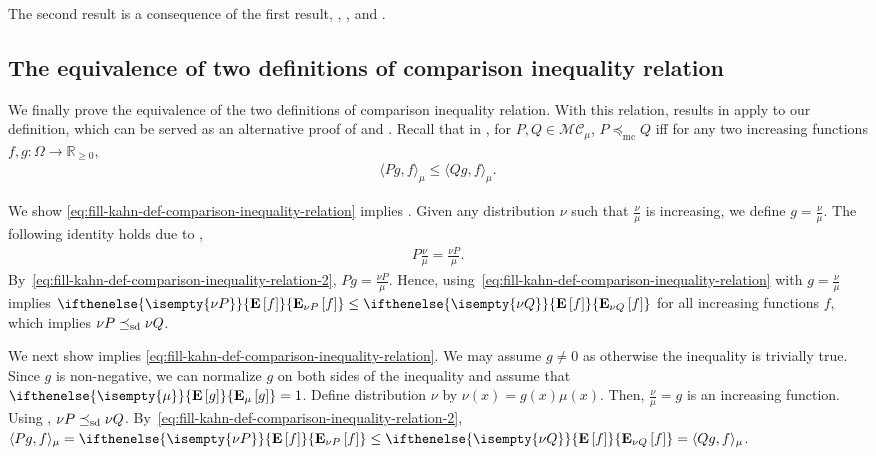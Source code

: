 \documentclass[11pt,a4paper]{article}
\newcommand{\sd}{\preceq_{\textnormal{sd}}}
\theoremstyle{definition}
\def\+#1{\mathcal{#1}} %
\newcommand{\E}[2][]{ \ifthenelse{\isempty{#1}}
  {\mathbf{\mathbf{E}}\left[#2\right]}
  {\mathbf{\mathbf{E}}_{#1}\left[#2\right]} }
\begin{document}
The second result is a consequence of the first result, , , and .


\subsection{The equivalence of two definitions of comparison inequality relation}
We finally prove the equivalence of the two definitions of comparison inequality relation. 
With this relation, results in \cite{FillK13} apply to our definition, which can be served as an alternative proof of  and .
Recall that in \cite{FillK13}, for $P,Q \in \+{MC}_\mu$, $P \preceq_{\text{mc}} Q$ iff for any two increasing functions $f,g:\Omega \to \mathbb{R}_{\geq 0}$, 
\begin{align}\label{eq:fill-kahn-def-comparison-inequality-relation}  
\langle Pg, f \rangle_\mu \leq \langle Qg, f \rangle_\mu.
\end{align}


We show \eqref{eq:fill-kahn-def-comparison-inequality-relation} implies . Given any distribution $\nu$ such that $\frac{\nu}{\mu}$ is increasing, we define $g = \frac{\nu}{\mu}$. The following identity holds due to ,
\begin{align}\label{eq:fill-kahn-def-comparison-inequality-relation-2}
 P \frac{\nu}{\mu} = \frac{\nu P}{\mu}.
\end{align}
 By~\eqref{eq:fill-kahn-def-comparison-inequality-relation-2}, $Pg = \frac{\nu P}{\mu}$. Hence, using~\eqref{eq:fill-kahn-def-comparison-inequality-relation} with $g = \frac{\nu}{\mu}$ implies $\E[\nu P]{f} \leq \E[\nu Q]{f}$ for all increasing functions $f$, which implies $\nu P \sd \nu Q$.

We next show  implies \eqref{eq:fill-kahn-def-comparison-inequality-relation}. We may assume $g \neq 0$ as otherwise the inequality is trivially true.
Since $g$ is non-negative, we can normalize $g$ on both sides of the inequality and assume that $\E[\mu]{g} = 1$. Define distribution $\nu$ by $\nu(x) = g(x)\mu(x)$. Then, $\frac{\nu}{\mu} = g$ is an increasing function. Using , $\nu P \sd \nu Q$. By~\eqref{eq:fill-kahn-def-comparison-inequality-relation-2}, $\langle Pg, f \rangle_\mu = \E[\nu P]{f} \leq \E[\nu Q]{f}= \langle Qg, f \rangle_\mu$.
\end{document}
